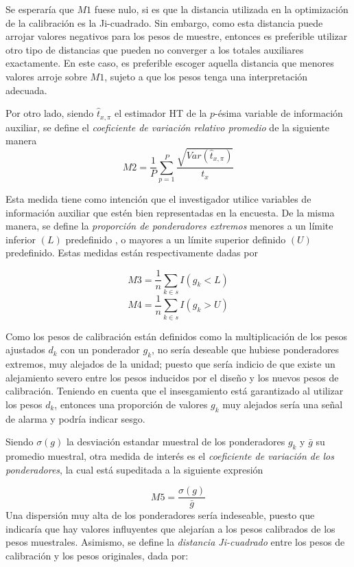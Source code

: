 \documentclass[
  12pt,
  spanish,
]{book}
\begin{document}
Se esperaría que \(M1\) fuese nulo, si es que la distancia utilizada en la optimización de la calibración es la Ji-cuadrado. Sin embargo, como esta distancia puede arrojar valores negativos para los pesos de muestre, entonces es preferible utilizar otro tipo de distancias que pueden no converger a los totales auxiliares exactamente. En este caso, es preferible escoger aquella distancia que menores valores arroje sobre \(M1\), sujeto a que los pesos tenga una interpretación adecuada.

Por otro lado, siendo \(\hat{t}_{x, \pi}\) el estimador HT de la \(p\)-ésima variable de información auxiliar, se define el \emph{coeficiente de variación relativo promedio} de la siguiente manera
\[
M2= \frac{1}{P} \sum_{p=1}^P \frac{\sqrt{Var(\hat{t}_{x,\pi})}}{t_x} 
\]

Esta medida tiene como intención que el investigador utilice variables de información auxiliar que estén bien representadas en la encuesta. De la misma manera, se define la \emph{proporción de ponderadores extremos} menores a un límite inferior \((L)\) predefinido , o mayores a un límite superior definido \((U)\) predefinido. Estas medidas están respectivamente dadas por

\[
M3 = \frac{1}{n} \sum_{k \in s}I(g_k<L)
\]
\[
M4= \frac{1}{n} \sum_{k \in s}I(g_k>U)
\]

Como los pesos de calibración están definidos como la multiplicación de los pesos ajustados \(d_{k}\) con un ponderador \(g_k\), no sería deseable que hubiese ponderadores extremos, muy alejados de la unidad; puesto que sería indicio de que existe un alejamiento severo entre los pesos inducidos por el diseño y los nuevos pesos de calibración. Teniendo en cuenta que el insesgamiento está garantizado al utilizar los pesos \(d_k\), entonces una proporción de valores \(g_k\) muy alejados sería una señal de alarma y podría indicar sesgo.

Siendo \(\sigma(g)\) la desviación estandar muestral de los ponderadores \(g_k\) y \(\bar{g}\) su promedio muestral, otra medida de interés es el \emph{coeficiente de variación de los ponderadores}, la cual está supeditada a la siguiente expresión

\[
M5= \frac{\sigma(g)}{\bar{g}}
\]
Una dispersión muy alta de los ponderadores sería indeseable, puesto que indicaría que hay valores influyentes que alejarían a los pesos calibrados de los pesos muestrales. Asimismo, se define la \emph{distancia Ji-cuadrado} entre los pesos de calibración y los pesos originales, dada por:
\end{document}
